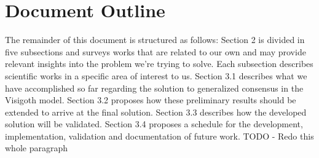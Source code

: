 \section{Document Outline}

The remainder of this document is structured as follows: Section 2 is divided in five subsections and surveys works that are related to our own and may provide relevant insights into the problem we're trying to solve. Each subsection describes scientific works in a specific area of interest to us. Section 3.1 describes what we have accomplished so far regarding the solution to generalized consensus in the Visigoth model. Section 3.2 proposes how these preliminary results should be extended to arrive at the final solution. Section 3.3 describes how the developed solution will be validated. Section 3.4 proposes a schedule for the development, implementation, validation and documentation of future work.{\color{red} TODO - Redo this whole paragraph}
